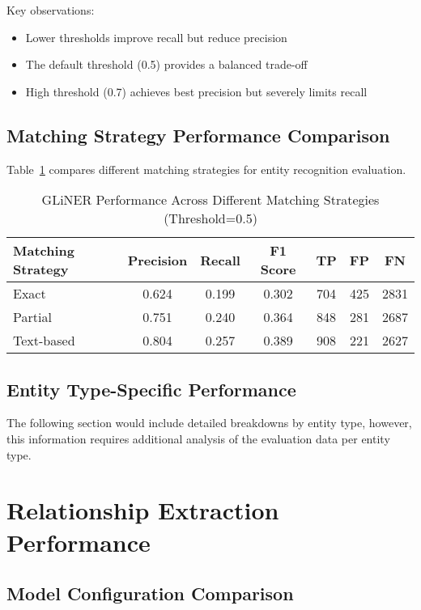 Key observations:
\begin{itemize}
    \item Lower thresholds improve recall but reduce precision
    \item The default threshold (0.5) provides a balanced trade-off
    \item High threshold (0.7) achieves best precision but severely limits recall
\end{itemize}

\subsection{Matching Strategy Performance Comparison}

Table~\ref{tab:matching-strategies} compares different matching strategies for entity recognition evaluation.

\begin{table}[htbp]
\centering
\caption{GLiNER Performance Across Different Matching Strategies (Threshold=0.5)}
\label{tab:matching-strategies}
\begin{tabular}{lcccccc}
\toprule
\textbf{Matching Strategy} & \textbf{Precision} & \textbf{Recall} & \textbf{F1 Score} & \textbf{TP} & \textbf{FP} & \textbf{FN} \\
\midrule
Exact & 0.624 & 0.199 & 0.302 & 704 & 425 & 2831 \\
Partial & 0.751 & 0.240 & 0.364 & 848 & 281 & 2687 \\
Text-based & 0.804 & 0.257 & 0.389 & 908 & 221 & 2627 \\
\bottomrule
\end{tabular}
\end{table}

\subsection{Entity Type-Specific Performance}

The following section would include detailed breakdowns by entity type, however, this information requires additional analysis of the evaluation data per entity type.

\section{Relationship Extraction Performance}

\subsection{Model Configuration Comparison}

